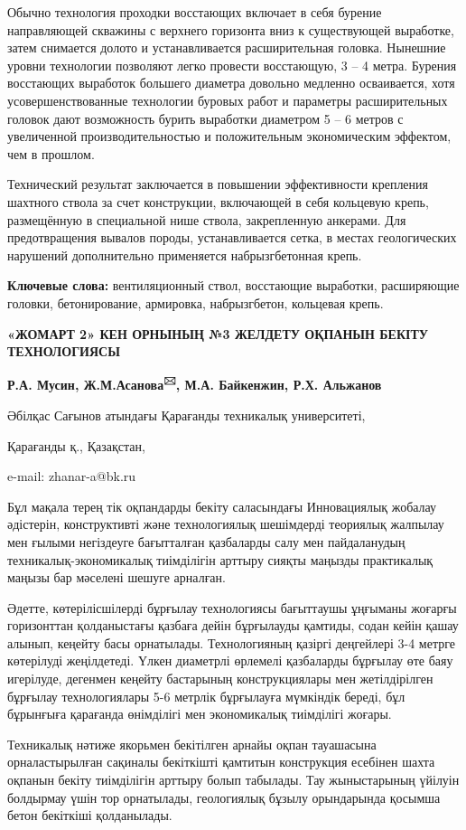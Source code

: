 Обычно технология проходки восстающих включает в себя бурение
направляющей скважины с верхнего горизонта вниз к существующей
выработке, затем снимается долото и устанавливается расширительная
головка. Нынешние уровни технологии позволяют легко провести восстающую,
3 -- 4 метра. Бурения восстающих выработок большего диаметра довольно
медленно осваивается, хотя усовершенствованные технологии буровых работ
и параметры расширительных головок дают возможность бурить выработки
диаметром 5 -- 6 метров с увеличенной производительностью и
положительным экономическим эффектом, чем в прошлом.

Технический результат заключается в повышении эффективности крепления
шахтного ствола за счет конструкции, включающей в себя кольцевую крепь,
размещённую в специальной нише ствола, закрепленную анкерами. Для
предотвращения вывалов породы, устанавливается сетка, в местах
геологических нарушений дополнительно применяется набрызгбетонная крепь.

{\bfseries Ключевые слова:} вентиляционный ствол, восстающие выработки,
расширяющие головки, бетонирование, армировка, набрызгбетон, кольцевая
крепь.

{\bfseries «ЖОМАРТ 2» КЕН ОРНЫНЫҢ №3 ЖЕЛДЕТУ ОҚПАНЫН БЕКІТУ ТЕХНОЛОГИЯСЫ}

{\bfseries Р.А. Мусин, Ж.М.Асанова\textsuperscript{🖂}, М.А. Байкенжин, Р.Х.
Альжанов}

Әбілқас Сағынов атындағы Қарағанды техникалық университеті,

Қарағанды қ., Қазақстан,

e-mail: zhanar-a@bk.ru

Бұл мақала терең тік оқпандарды бекіту саласындағы Инновациялық жобалау
әдістерін, конструктивті және технологиялық шешімдерді теориялық
жалпылау мен ғылыми негіздеуге бағытталған қазбаларды салу мен
пайдаланудың техникалық-экономикалық тиімділігін арттыру сияқты маңызды
практикалық маңызы бар мәселені шешуге арналған.

Әдетте, көтерілісшілерді бұрғылау технологиясы бағыттаушы ұңғыманы
жоғарғы горизонттан қолданыстағы қазбаға дейін бұрғылауды қамтиды, содан
кейін қашау алынып, кеңейту басы орнатылады. Технологияның қазіргі
деңгейлері 3-4 метрге көтерілуді жеңілдетеді. Үлкен диаметрлі өрлемелі
қазбаларды бұрғылау өте баяу игерілуде, дегенмен кеңейту бастарының
конструкциялары мен жетілдірілген бұрғылау технологиялары 5-6 метрлік
бұрғылауға мүмкіндік береді, бұл бұрынғыға қарағанда өнімділігі мен
экономикалық тиімділігі жоғары.

Техникалық нәтиже якорьмен бекітілген арнайы оқпан тауашасына
орналастырылған сақиналы бекіткішті қамтитын конструкция есебінен шахта
оқпанын бекіту тиімділігін арттыру болып табылады. Тау жыныстарының
үйілуін болдырмау үшін тор орнатылады, геологиялық бұзылу орындарында
қосымша бетон бекіткіші қолданылады.

